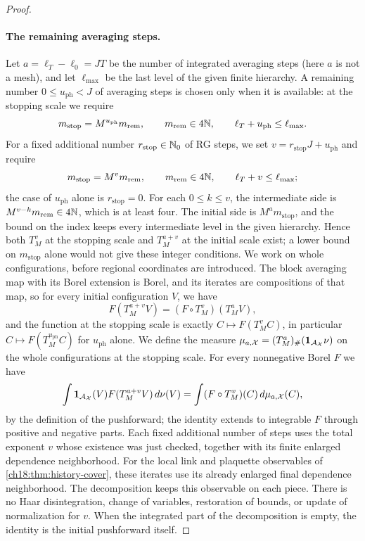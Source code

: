 \begin{proof}
\paragraph{The remaining averaging steps.}
Let $a=\ell_T-\ell_0=JT$ be the number of integrated averaging steps (here $a$ is not a mesh), and let $\ell_{\max}$ be the last level of the given finite hierarchy. A remaining number $0\le u_{\mathrm{ph}}<J$ of averaging steps is chosen only when it is available: at the stopping scale we require
\[
 m_{\mathrm{stop}}=M^{u_{\mathrm{ph}}}m_{\mathrm{rem}},
 \qquad m_{\mathrm{rem}}\in4\mathbb N,\qquad
 \ell_T+u_{\mathrm{ph}}\le\ell_{\max}.
\]
For a fixed additional number $r_{\mathrm{stop}}\in\mathbb N_0$ of RG steps, we set $v=r_{\mathrm{stop}}J+u_{\mathrm{ph}}$ and require
\[
 m_{\mathrm{stop}}=M^v m_{\mathrm{rem}},\qquad
 m_{\mathrm{rem}}\in4\mathbb N,\qquad
 \ell_T+v\le\ell_{\max};
\]
the case of $u_{\mathrm{ph}}$ alone is $r_{\mathrm{stop}}=0$. For each $0\le k\le v$, the intermediate side is $M^{v-k}m_{\mathrm{rem}}\in4\mathbb N$, which is at least four. The initial side is $M^{a}m_{\mathrm{stop}}$, and the bound on the index keeps every intermediate level in the given hierarchy. Hence both $T_M^v$ at the stopping scale and $T_M^{a+v}$ at the initial scale exist; a lower bound on $m_{\mathrm{stop}}$ alone would not give these integer conditions. We work on whole configurations, before regional coordinates are introduced. The block averaging map with its Borel extension is Borel, and its iterates are compositions of that map, so for every initial configuration $V$, we have
\[
 F(T_M^{a+v}V)=(F\circ T_M^v)(T_M^{a}V),
\]
and the function at the stopping scale is exactly $C\mapsto F(T_M^vC)$, in particular $C\mapsto F(T_M^{u_{\mathrm{ph}}}C)$ for $u_{\mathrm{ph}}$ alone. We define the measure $\mu_{a,\mathcal X}=(T_M^{a})_\#(\mathbf 1_{\mathcal A_{\mathcal X}}\nu)$ on the whole configurations at the stopping scale. For every nonnegative Borel $F$ we have
\begin{equation}\label{ch18:eq:terminal-source-pullback}
 \int \mathbf 1_{\mathcal A_{\mathcal X}}(V)
                  F(T_M^{a+v}V)\,d\nu(V)
       =\int (F\circ T_M^v)(C)\,d\mu_{a,\mathcal X}(C),
\end{equation}
by the definition of the pushforward; the identity extends to integrable $F$ through positive and negative parts. Each fixed additional number of steps uses the total exponent $v$ whose existence was just checked, together with its finite enlarged dependence neighborhood. For the local link and plaquette observables of \cref{ch18:thm:history-cover}, these iterates use its already enlarged final dependence neighborhood. The decomposition keeps this observable on each piece. There is no Haar disintegration, change of variables, restoration of bounds, or update of normalization for $v$. When the integrated part of the decomposition is empty, the identity is the initial pushforward itself.


\end{proof}
